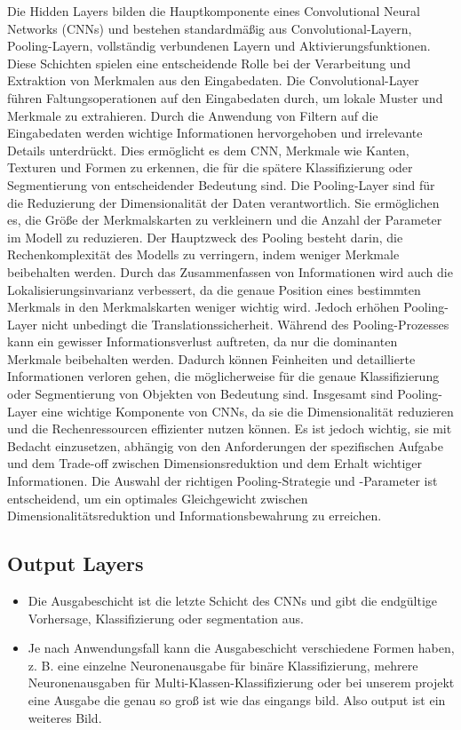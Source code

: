 Die Hidden Layers bilden die Hauptkomponente eines Convolutional Neural Networks (CNNs) und bestehen standardmäßig aus Convolutional-Layern, Pooling-Layern, vollständig verbundenen Layern und Aktivierungsfunktionen. 
Diese Schichten spielen eine entscheidende Rolle bei der Verarbeitung und Extraktion von Merkmalen aus den Eingabedaten.
Die Convolutional-Layer führen Faltungsoperationen auf den Eingabedaten durch, um lokale Muster und Merkmale zu extrahieren. Durch die Anwendung von Filtern auf die Eingabedaten werden wichtige Informationen hervorgehoben und irrelevante Details unterdrückt. 
Dies ermöglicht es dem CNN, Merkmale wie Kanten, Texturen und Formen zu erkennen, die für die spätere Klassifizierung oder Segmentierung von entscheidender Bedeutung sind.
Die Pooling-Layer sind für die Reduzierung der Dimensionalität der Daten verantwortlich. 
Sie ermöglichen es, die Größe der Merkmalskarten zu verkleinern und die Anzahl der Parameter im Modell zu reduzieren. 
Der Hauptzweck des Pooling besteht darin, die Rechenkomplexität des Modells zu verringern, indem weniger Merkmale beibehalten werden. 
Durch das Zusammenfassen von Informationen wird auch die Lokalisierungsinvarianz verbessert, da die genaue Position eines bestimmten Merkmals in den Merkmalskarten weniger wichtig wird.
Jedoch erhöhen Pooling-Layer nicht unbedingt die Translationssicherheit. Während des Pooling-Prozesses kann ein gewisser Informationsverlust auftreten, da nur die dominanten Merkmale beibehalten werden. 
Dadurch können Feinheiten und detaillierte Informationen verloren gehen, die möglicherweise für die genaue Klassifizierung oder Segmentierung von Objekten von Bedeutung sind.
Insgesamt sind Pooling-Layer eine wichtige Komponente von CNNs, da sie die Dimensionalität reduzieren und die Rechenressourcen effizienter nutzen können. 
Es ist jedoch wichtig, sie mit Bedacht einzusetzen, abhängig von den Anforderungen der spezifischen Aufgabe und dem Trade-off zwischen Dimensionsreduktion und dem Erhalt wichtiger Informationen. 
Die Auswahl der richtigen Pooling-Strategie und -Parameter ist entscheidend, um ein optimales Gleichgewicht zwischen Dimensionalitätsreduktion und Informationsbewahrung zu erreichen.

\subsection{Output Layers}
\begin{itemize}
  \item Die Ausgabeschicht ist die letzte Schicht des CNNs und gibt die endgültige Vorhersage, Klassifizierung oder segmentation aus.
  \item Je nach Anwendungsfall kann die Ausgabeschicht verschiedene Formen haben, z. B. eine einzelne Neuronenausgabe für binäre Klassifizierung, mehrere Neuronenausgaben für Multi-Klassen-Klassifizierung oder bei unserem projekt eine Ausgabe die genau so groß ist wie das eingangs bild. Also output ist ein weiteres Bild.
\end{itemize}

